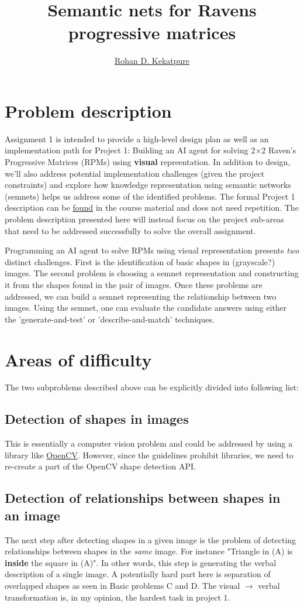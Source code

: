 \documentclass[10pt,letterpaper]{article}
\begin{document}
\title{\Large{Semantic nets for Ravens progressive matrices}}
\author{\href{mailto:rohan.kekatpure@gmail.com}{Rohan D. Kekatpure}}
\address{}
\email{}

\section{Problem description}
Assignment 1 is intended to provide a high-level design plan as well as an implementation path for Project 1: Building an AI agent for solving 2$\times 2$ Raven's Progressive Matrices (RPMs) using {\bf visual} repreentation. In addition to design, we'll also address potential implementation challenges (given the project constraints) and explore how knowledge representation using semantic networks (semnets) helps us address some of the identified problems. The formal Project 1 description can be \href{https://docs.google.com/document/d/1ADrey2Q5XzDAxWpoM187D0NGyvzl0RLawry12Zx4qFI/edit#}{found} in the course material and does not need repetition. The problem description presented here will instead focus on the project sub-areas that need to be addressed successfully to solve the overall assignment.

Programming an AI agent to solve RPMs using visual representation presents {\em two} distinct challenges. First is the identification of basic shapes in (grayscale?) images. The second problem is choosing a semnet representation and constructing it from the shapes found in the pair of images. Once these problems are addressed, we can build a semnet representing the relationship between two images. Using the semnet, one can evaluate the candidate answers using either the 'generate-and-test' or 'describe-and-match' techniques. 
\section{Areas of difficulty}
The two subproblems described above can be explicitly divided into following list:
\subsection{Detection of shapes in images}\label{s1}
This is essentially a computer vision problem and could be addressed by using a library like \href{http://opencv.org/}{OpenCV}. However, since the guidelines prohibit libraries, we need to re-create a part of the OpenCV shape detection API.
\subsection{Detection of relationships between shapes in an image}\label{s2}
The next step after detecting shapes in a given image is the problem of detecting relationships between shapes in the {\em same} image. For instance "Triangle in (A) is {\bf inside} the square in (A)". In other words, this step is generating the verbal description of a single image. A potentially hard part here is separation of overlapped shapes as seen in Basic problems C and D. The visual $\to$ verbal transformation is, in my opinion, the hardest task in project 1.
\end{document}
